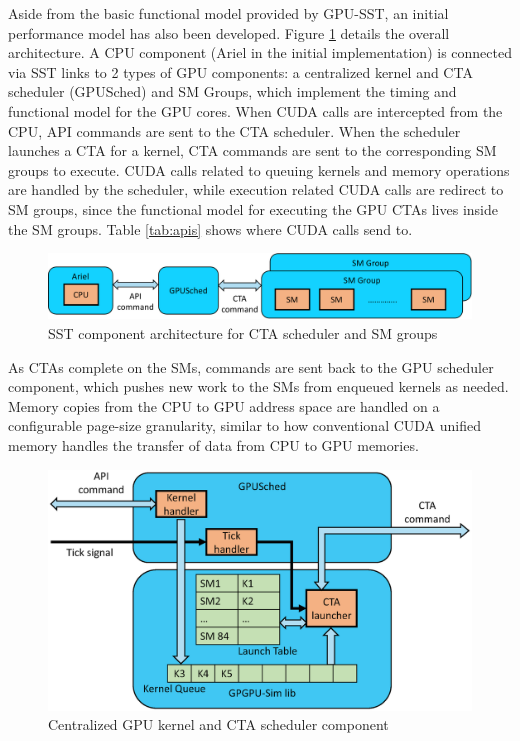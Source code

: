 Aside from the basic functional model provided by GPU-SST, an initial
performance model has also been developed. Figure \ref{fig:gpu_sched} details
the overall architecture. A CPU component (Ariel in the initial implementation)
is connected via SST links to 2 types of GPU components: a centralized kernel and
CTA scheduler (GPUSched) and SM Groups, which implement the timing
and functional model for the GPU cores. When CUDA calls are intercepted
from the CPU, API commands are sent to the CTA scheduler. When the scheduler
launches a CTA for a kernel, CTA commands are sent to the corresponding SM groups
to execute. CUDA calls related to queuing kernels and memory operations are
handled by the scheduler, while execution related CUDA calls are redirect
to SM groups, since the functional model for executing the GPU CTAs lives inside
the SM groups. Table \ref{tab:apis} shows where CUDA calls send to. 

   \begin{figure}[!htb]
      \centering
      \setlength{\abovecaptionskip}{6pt plus 1pt minus 1pt}
      \includegraphics[width=.90\textwidth,keepaspectratio]{figures/2_1-eps-converted-to-crop.pdf}
      \captionsetup{width=.90\textwidth}
      \caption{SST component architecture for CTA scheduler and SM groups}
      \label{fig:gpu_sched}
   \end{figure}


As CTAs complete on the SMs, commands are sent back to the GPU scheduler
component, which pushes new work to the SMs from enqueued kernels as needed.
Memory copies from the CPU to GPU address space are handled on a configurable
page-size granularity, similar to how conventional CUDA unified memory handles
the transfer of data from CPU to GPU memories.

   \begin{figure}[!htb]
      \centering
      \setlength{\abovecaptionskip}{6pt plus 1pt minus 1pt}
      \includegraphics[width=.90\textwidth,keepaspectratio]{figures/scheduler.eps}
      \captionsetup{width=.75\textwidth}
      \caption{Centralized GPU kernel and CTA scheduler component}
      \label{fig:sched}
   \end{figure}

